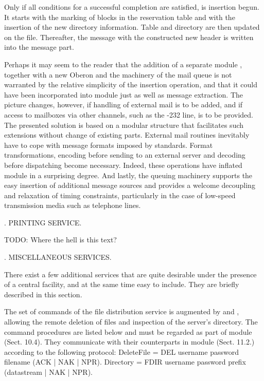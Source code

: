 Only if all conditions for a successful completion are satisfied, is insertion begun. It starts with the marking of blocks in the reservation table and with the insertion of the new directory information. Table and directory are then updated on the file. Thereafter, the message with the constructed new header is written into the message part.

Perhaps it may seem to the reader that the addition of a separate module , together with a new Oberon  and the machinery of the mail queue is not warranted by the relative simplicity of the insertion operation, and that it could have been incorporated into module  just as well as message extraction. The picture changes, however, if handling of external mail is to be added, and if access to mailboxes via other channels, such as the -232 line, is to be provided. The presented solution is based on a modular structure that facilitates such extensions without change of existing parts. External mail routines inevitably have to cope with message formats imposed by standards. Format transformations, encoding before sending to an external server and decoding before dispatching become necessary. Indeed, these operations have inflated module  in a surprising degree. And lastly, the queuing machinery supports the easy insertion of additional message sources and provides a welcome decoupling and relaxation of timing constraints, particularly in the case of low-speed transmission media such as telephone lines.

. PRINTING SERVICE.

TODO: Where the hell is this text?

. MISCELLANEOUS SERVICES.

There exist a few additional services that are quite desirable under the presence of a central facility, and at the same time easy to include. They are briefly described in this section.

The set of commands of the file distribution service is augmented by  and , allowing the remote deletion of files and inspection of the server's directory. The command procedures are listed below and must be regarded as part of module  (Sect. 10.4). They communicate with their counterparts in module  (Sect. 11.2.) according to the following protocol:
\begintt
DeleteFile = DEL username password filename (ACK | NAK | NPR).
Directory = FDIR username password prefix (datastream | NAK | NPR).
\endtt

